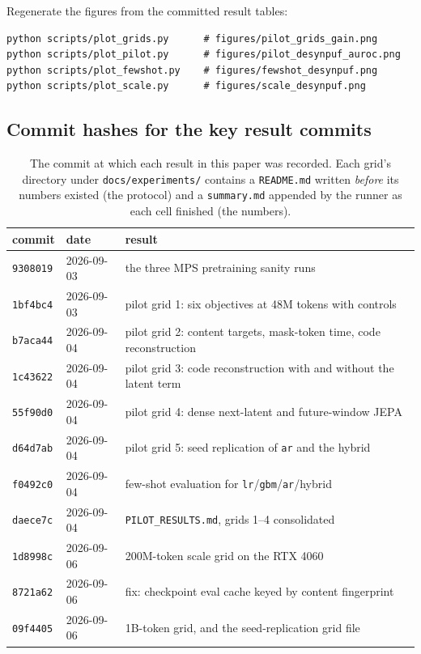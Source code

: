 \documentclass[11pt,a4paper]{article}
\newcommand{\code}[1]{\texttt{\small #1}}
\begin{document}
Regenerate the figures from the committed result tables:
\begin{verbatim}
python scripts/plot_grids.py      # figures/pilot_grids_gain.png
python scripts/plot_pilot.py      # figures/pilot_desynpuf_auroc.png
python scripts/plot_fewshot.py    # figures/fewshot_desynpuf.png
python scripts/plot_scale.py      # figures/scale_desynpuf.png
\end{verbatim}

\subsection{Commit hashes for the key result commits}

\begin{table}[h]
\centering\small
\caption{The commit at which each result in this paper was recorded. Each grid's
directory under \code{docs/experiments/} contains a \code{README.md} written
\emph{before} its numbers existed (the protocol) and a \code{summary.md}
appended by the runner as each cell finished (the numbers).}
\label{tab:commits}
\begin{tabular}{lll}
\toprule
commit & date & result \\
\midrule
\code{9308019} & 2026-09-03 & the three MPS pretraining sanity runs \\
\code{1bf4bc4} & 2026-09-03 & pilot grid 1: six objectives at 48M tokens with controls \\
\code{b7aca44} & 2026-09-04 & pilot grid 2: content targets, mask-token time, code reconstruction \\
\code{1c43622} & 2026-09-04 & pilot grid 3: code reconstruction with and without the latent term \\
\code{55f90d0} & 2026-09-04 & pilot grid 4: dense next-latent and future-window JEPA \\
\code{d64d7ab} & 2026-09-04 & pilot grid 5: seed replication of \code{ar} and the hybrid \\
\code{f0492c0} & 2026-09-04 & few-shot evaluation for \code{lr}/\code{gbm}/\code{ar}/hybrid \\
\code{daece7c} & 2026-09-04 & \code{PILOT\_RESULTS.md}, grids 1--4 consolidated \\
\code{1d8998c} & 2026-09-06 & 200M-token scale grid on the RTX 4060 \\
\code{8721a62} & 2026-09-06 & fix: checkpoint eval cache keyed by content fingerprint \\
\code{09f4405} & 2026-09-06 & 1B-token grid, and the seed-replication grid file \\

\end{tabular}
\end{table}
\end{document}
